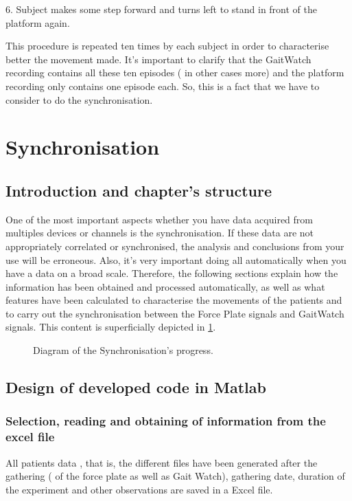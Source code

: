 6.	Subject makes some step  forward and turns left to stand in front of the platform again.

This procedure is repeated ten times by each subject in order to characterise better the movement made.
It’s important to clarify that the GaitWatch recording contains all these ten episodes ( in other cases more) and the platform recording only contains one episode each. So, this is a fact that we have to consider to do the synchronisation.

\section{Synchronisation}

\subsection{Introduction and chapter's structure}
One of the most important aspects whether you have data acquired from multiples devices or channels is the synchronisation. If these data are not appropriately correlated or synchronised, the analysis and conclusions from your use will be erroneous. Also, it’s very important doing all automatically when you have a data on a broad scale.
Therefore, the following sections explain how the information has been obtained and processed automatically, as well as what features have been calculated to characterise the movements of the patients and to carry out the synchronisation between the Force Plate signals and GaitWatch signals. This content is superficially depicted in \ref{fig:diagramSynchronisation}.

\begin{figure}[H]
	\centering
	\caption{Diagram of the Synchronisation's progress.}
	\label{fig:diagramSynchronisation}
\end{figure}

\subsection{Design of developed code  in Matlab}
\subsubsection{Selection, reading and obtaining of information from the excel file}
All patients data , that is, the different files have been generated after the gathering (  of the force plate as well as Gait Watch), gathering date, duration of the experiment and other observations are saved in a Excel file. 

